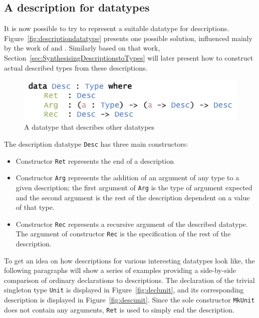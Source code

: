 \documentclass{ituthesis}
\newcommand{\ttconstructor}[1]{\textcolor{constructor-color}{\texttt{#1}}}
\newcommand{\tttype}[1]{\textcolor{type-color}{\texttt{#1}}}
\theoremstyle{break}
\begin{document}
\subsection{A description for datatypes}
\label{sub:ADescriptionforDatatypes}
It is now possible to try to represent a suitable datatype for descriptions.
Figure~\ref{fig:descriptiondatatype} presents one possible solution, influenced mainly by the work of \textcite{mcbride2010ornamental} and \textcite{diehl2014eliminators}.
Similarly based on that work, Section~\ref{sec:SynthesisingDescriptionstoTypes} will later present how to construct actual described types from these descriptions.

\begin{figure}[ht]
\begin{center}
    \includegraphics[scale=0.5]{Figures/ADescriptionforDatatypesSimple.png}
\end{center}
\caption{A datatype that describes other datatypes}
\label{fig:simpldescdatatype}
\end{figure}

The description datatype \tttype{Desc} has three main constructors:
\begin{itemize}
  \item  Constructor \ttconstructor{Ret} represents the end of a description
  \item  Constructor \ttconstructor{Arg} represents the addition of an argument of any type to a given description; the first argument of \ttconstructor{Arg} is the type of argument expected and the second argument is the rest of the description dependent on a value of that type.
  \item  Constructor \ttconstructor{Rec} represents a recursive argument of the described datatype. The argument of constructor \ttconstructor{Rec} is the specification of the rest of the description.
\end{itemize}

To get an idea on how descriptions for various interesting datatypes look like, the following paragraphs will show a series of examples providing a side-by-side comparison of ordinary declarations to descriptions.
The declaration of the trivial singleton type \tttype{Unit} is displayed in Figure~\ref{fig:declunit}, and its corresponding description is displayed in Figure~\ref{fig:descunit}.
Since the sole constructor \ttconstructor{MkUnit} does not contain any arguments, \ttconstructor{Ret} is used to simply end the description.
\end{document}
